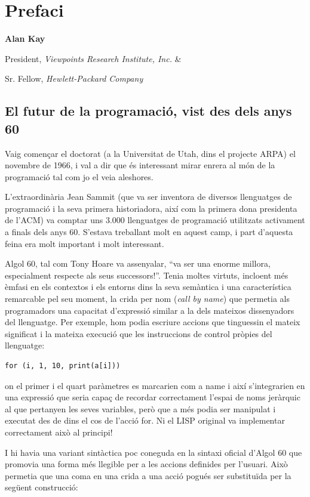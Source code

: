 \chapter{Prefaci}

\noindent
\textbf{Alan Kay}

President, \emph{Viewpoints Research Institute, Inc.} \&

Sr. Fellow, \emph{Hewlett-Packard Company}

\section*{El futur de la programació, vist des dels anys 60}

Vaig començar el doctorat (a la Universitat de Utah, dins el projecte ARPA) el novembre de 1966, i val a dir que és interessant mirar enrera al món de la programació tal com jo el veia aleshores.

L'extraordinària Jean Sammit (que va ser inventora de diversos llenguatges de programació i la seva primera historiadora, així com la primera dona presidenta de l'ACM) va comptar uns 3.000 llenguatges de programació utilitzats activament a finals dels anys 60. S'estava treballant molt en aquest camp, i part d'aquesta feina era molt important i molt interessant.

Algol 60, tal com Tony Hoare va assenyalar, ``va ser una enorme millora, especialment respecte als seus successors!''.  Tenia moltes virtuts, incloent més èmfasi en els contextos i els entorns dins la seva semàntica i una característica remarcable pel seu moment, la crida per nom (\emph{call by name}) que permetia als programadors una capacitat d'expressió similar a la dels mateixos dissenyadors del llenguatge. Per exemple, hom podia escriure accions que tinguessin el mateix significat i la mateixa execució que les instruccions de control pròpies del llenguatge:

\begin{verbatim}
for (i, 1, 10, print(a[i]))
\end{verbatim}

\noindent
on el primer i el quart paràmetres es marcarien com a \textsf{name} i així s'integrarien en una expressió que seria capaç de recordar correctament l'espai de noms jeràrquic al que pertanyen les seves variables, però que a més podia ser manipulat i executat des de dins el cos de l'acció \textsf{for}. Ni el LISP original va implementar correctament això al principi!

I hi havia una variant sintàctica poc coneguda en la sintaxi oficial d'Algol 60 que promovia una forma més llegible per a les accions definides per l'usuari. Això permetia que una coma en una crida a una acció pogués ser substituïda per la següent construcció:

